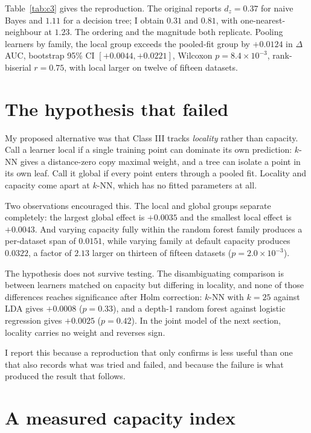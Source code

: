 \documentclass[10pt,twocolumn]{article}
\begin{document}
Table~\ref{tab:c3} gives the reproduction. The original reports $d_z = 0.37$ for
naive Bayes and $1.11$ for a decision tree; I obtain $0.31$ and $0.81$, with
one-nearest-neighbour at $1.23$. The ordering and the magnitude both replicate.
Pooling learners by family, the local group exceeds the pooled-fit group by
$+0.0124$ in $\Delta$AUC, bootstrap 95\% CI $[+0.0044, +0.0221]$, Wilcoxon
$p = 8.4\times10^{-3}$, rank-biserial $r = 0.75$, with local larger on twelve of
fifteen datasets.

\section{The hypothesis that failed}
\label{sec:locality}

My proposed alternative was that Class III tracks \emph{locality} rather than
capacity. Call a learner local if a single training point can dominate its own
prediction: $k$-NN gives a distance-zero copy maximal weight, and a tree can
isolate a point in its own leaf. Call it global if every point enters through a
pooled fit. Locality and capacity come apart at $k$-NN, which has no fitted
parameters at all.

Two observations encouraged this. The local and global groups separate
completely: the largest global effect is $+0.0035$ and the smallest local effect
is $+0.0043$. And varying capacity fully within the random forest family
produces a per-dataset span of $0.0151$, while varying family at default capacity
produces $0.0322$, a factor of $2.13$ larger on thirteen of fifteen datasets
($p = 2.0\times10^{-3}$).

The hypothesis does not survive testing. The disambiguating comparison is
between learners matched on capacity but differing in locality, and none of those
differences reaches significance after Holm correction: $k$-NN with $k=25$
against LDA gives $+0.0008$ ($p = 0.33$), and a depth-1 random forest against
logistic regression gives $+0.0025$ ($p = 0.42$). In the joint model of the next
section, locality carries no weight and reverses sign.

I report this because a reproduction that only confirms is less useful than one
that also records what was tried and failed, and because the failure is what
produced the result that follows.

\section{A measured capacity index}
\label{sec:index}
\end{document}
